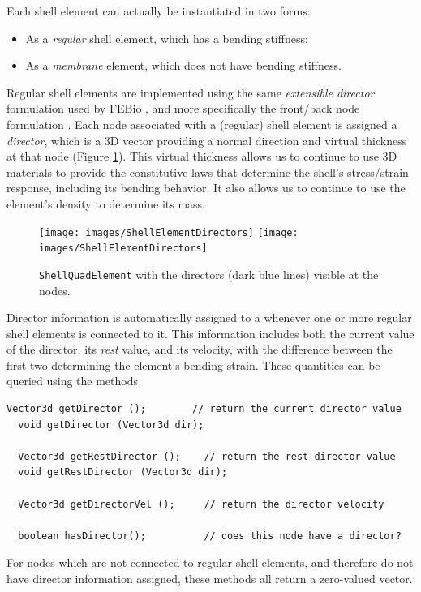 
Each shell element can actually be instantiated in two forms:

\begin{itemize}

\item As a {\it regular} shell element, which has a bending stiffness;

\item As a {\it membrane} element, which does not have bending
stiffness.

\end{itemize}

Regular shell elements are implemented using the same {\it
extensible director} formulation used by FEBio \cite{MaasFEBio2012},
and more specifically the front/back node formulation
\cite{FEBioTheory2018}.  Each node associated with a (regular)
shell element is assigned a {\it director}, which is a 3D vector
providing a normal direction and virtual thickness at that node
(Figure \ref{ShellElementDirectors:fig}). This virtual thickness
allows us to continue to use 3D materials to provide
the constitutive laws that determine the
shell's stress/strain response, including its bending behavior. It
also allows us to continue to use the element's {\sf density} to
determine its mass.

\begin{figure}[ht]
\begin{center}
\iflatexml
 \texttt{[image: images/ShellElementDirectors]}
\else
 \texttt{[image: images/ShellElementDirectors]}
\fi
\end{center}
\caption{{\tt ShellQuadElement} with the directors (dark blue lines)
visible at the nodes.}
\label{ShellElementDirectors:fig}
\end{figure}

Director information is automatically assigned to a
 whenever one or more
regular shell elements is connected to it. This information includes both the
current value of the director, its {\it rest} value, and its velocity,
with the difference between the first two determining the element's
bending strain.  These quantities can be queried using the methods
%
\begin{lstlisting}[]
  Vector3d getDirector ();        // return the current director value
  void getDirector (Vector3d dir);

  Vector3d getRestDirector ();    // return the rest director value
  void getRestDirector (Vector3d dir);

  Vector3d getDirectorVel ();     // return the director velocity

  boolean hasDirector();          // does this node have a director?
\end{lstlisting}
%
For nodes which are not connected to regular shell elements, and
therefore do not have director information assigned, these methods all
return a zero-valued vector.

